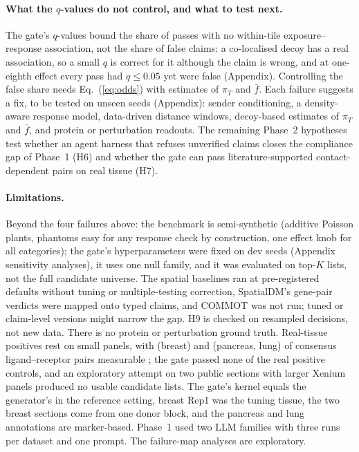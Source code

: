 \documentclass[letterpaper]{article} %
\begin{document}
\paragraph{What the $q$-values do not control, and what to test next.} The gate's $q$-values bound the share of passes
with no within-tile exposure--response association, not the share of false claims: a co-localised decoy has a real
association, so a small $q$ is correct for it although the claim is wrong, and at one-eighth effect every pass had
$q\leq0.05$ yet \hfiveDefaultEighthPRafter{} were false (Appendix).
Controlling the false share needs Eq.~(\ref{eq:odds}) with estimates of $\pi_T$ and $\bar f$. Each failure suggests a
fix, to be tested on unseen seeds (Appendix): sender conditioning, a density-aware response model, data-driven distance
windows, decoy-based estimates of $\pi_T$ and $\bar f$, and protein or perturbation readouts. The remaining Phase~2
hypotheses test whether an agent harness that refuses unverified claims closes the compliance gap of Phase~1 (H6) and
whether the gate can pass literature-supported contact-dependent pairs on real tissue (H7).

\paragraph{Limitations.} Beyond the four failures above: the benchmark is semi-synthetic (additive Poisson plants,
phantoms easy for any response check by construction, one effect knob for all categories); the gate's hyperparameters
were fixed on dev seeds (Appendix sensitivity analyses), it uses one null family, and it was evaluated on top-$K$ lists,
not the full candidate universe.
The spatial baselines ran at pre-registered defaults without tuning or multiple-testing correction, SpatialDM's
gene-pair verdicts were mapped onto typed claims, and COMMOT was not run; tuned or claim-level versions might narrow the
gap. H9 is checked on resampled decisions, not new data. There is no protein or perturbation ground truth. Real-tissue
positives rest on small panels, with \lrBreastRepone{} (breast) and \lrPancreas{} (pancreas, lung) of \lrConsensus{}
consensus ligand--receptor pairs measurable \cite{turei2021omnipath,dimitrov2022liana}; the gate passed none of the
real positive controls, and an exploratory attempt on two public sections with larger Xenium panels produced no usable
candidate lists. The gate's kernel equals the generator's in the reference setting, breast Rep1 was the tuning tissue,
the two breast sections come from one donor block, and the pancreas and lung annotations are marker-based. Phase~1 used
two LLM families with three runs per dataset and one prompt. The failure-map analyses are exploratory.
\end{document}
